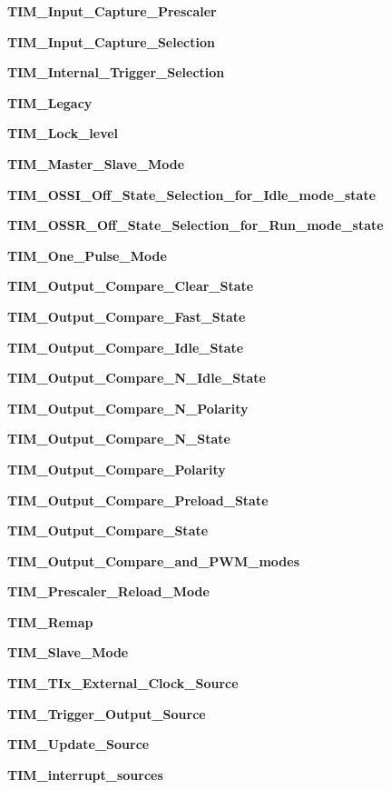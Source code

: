 \begin{DoxyCompactItemize}
\item 
\textbf{ T\+I\+M\+\_\+\+Input\+\_\+\+Capture\+\_\+\+Prescaler}
\item 
\textbf{ T\+I\+M\+\_\+\+Input\+\_\+\+Capture\+\_\+\+Selection}
\item 
\textbf{ T\+I\+M\+\_\+\+Internal\+\_\+\+Trigger\+\_\+\+Selection}
\item 
\textbf{ T\+I\+M\+\_\+\+Legacy}
\item 
\textbf{ T\+I\+M\+\_\+\+Lock\+\_\+level}
\item 
\textbf{ T\+I\+M\+\_\+\+Master\+\_\+\+Slave\+\_\+\+Mode}
\item 
\textbf{ T\+I\+M\+\_\+\+O\+S\+S\+I\+\_\+\+Off\+\_\+\+State\+\_\+\+Selection\+\_\+for\+\_\+\+Idle\+\_\+mode\+\_\+state}
\item 
\textbf{ T\+I\+M\+\_\+\+O\+S\+S\+R\+\_\+\+Off\+\_\+\+State\+\_\+\+Selection\+\_\+for\+\_\+\+Run\+\_\+mode\+\_\+state}
\item 
\textbf{ T\+I\+M\+\_\+\+One\+\_\+\+Pulse\+\_\+\+Mode}
\item 
\textbf{ T\+I\+M\+\_\+\+Output\+\_\+\+Compare\+\_\+\+Clear\+\_\+\+State}
\item 
\textbf{ T\+I\+M\+\_\+\+Output\+\_\+\+Compare\+\_\+\+Fast\+\_\+\+State}
\item 
\textbf{ T\+I\+M\+\_\+\+Output\+\_\+\+Compare\+\_\+\+Idle\+\_\+\+State}
\item 
\textbf{ T\+I\+M\+\_\+\+Output\+\_\+\+Compare\+\_\+\+N\+\_\+\+Idle\+\_\+\+State}
\item 
\textbf{ T\+I\+M\+\_\+\+Output\+\_\+\+Compare\+\_\+\+N\+\_\+\+Polarity}
\item 
\textbf{ T\+I\+M\+\_\+\+Output\+\_\+\+Compare\+\_\+\+N\+\_\+\+State}
\item 
\textbf{ T\+I\+M\+\_\+\+Output\+\_\+\+Compare\+\_\+\+Polarity}
\item 
\textbf{ T\+I\+M\+\_\+\+Output\+\_\+\+Compare\+\_\+\+Preload\+\_\+\+State}
\item 
\textbf{ T\+I\+M\+\_\+\+Output\+\_\+\+Compare\+\_\+\+State}
\item 
\textbf{ T\+I\+M\+\_\+\+Output\+\_\+\+Compare\+\_\+and\+\_\+\+P\+W\+M\+\_\+modes}
\item 
\textbf{ T\+I\+M\+\_\+\+Prescaler\+\_\+\+Reload\+\_\+\+Mode}
\item 
\textbf{ T\+I\+M\+\_\+\+Remap}
\item 
\textbf{ T\+I\+M\+\_\+\+Slave\+\_\+\+Mode}
\item 
\textbf{ T\+I\+M\+\_\+\+T\+Ix\+\_\+\+External\+\_\+\+Clock\+\_\+\+Source}
\item 
\textbf{ T\+I\+M\+\_\+\+Trigger\+\_\+\+Output\+\_\+\+Source}
\item 
\textbf{ T\+I\+M\+\_\+\+Update\+\_\+\+Source}
\item 
\textbf{ T\+I\+M\+\_\+interrupt\+\_\+sources}
\end{DoxyCompactItemize}
